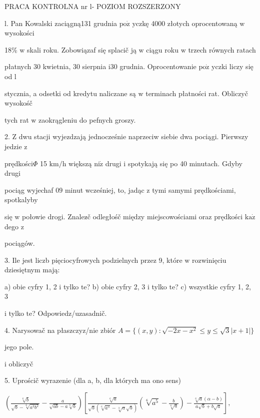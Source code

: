 \documentclass[a4paper,12pt]{article}
\begin{document}
PRACA KONTROLNA nr l- POZIOM ROZSZERZONY

l. Pan Kowalski zaciągną131 grudnia $\mathrm{p}\mathrm{o}\dot{\mathrm{z}}$ yczkę 4000 złotych oprocentowaną $\mathrm{w}$ wysokości

18\% $\mathrm{w}$ skali roku. Zobowiązaf się splacič ją $\mathrm{w}$ ciągu roku $\mathrm{w}$ trzech równych ratach

płatnych 30 kwietnia, 30 sierpnia $\mathrm{i}30$ grudnia. Oprocentowanie $\mathrm{p}\mathrm{o}\dot{\mathrm{z}}$ yczki liczy się od l

stycznia, a odsetki od kredytu naliczane są $\mathrm{w}$ terminach płatności rat. Obliczyč wysokośč

tych rat $\mathrm{w}$ zaokrągleniu do pefnych groszy.

2. $\mathrm{Z}$ dwu stacji wyjezdzają jednocześnie naprzeciw siebie dwa pociągi. Pierwszy jedzie $\mathrm{z}$

prędkości$\Phi$ 15 $\mathrm{k}\mathrm{m}/\mathrm{h}$ większą $\mathrm{n}\mathrm{i}\dot{\mathrm{z}}$ drugi $\mathrm{i}$ spotykają się po 40 minutach. Gdyby drugi

pociąg wyjechaf $09$ minut wcześniej, to, jadąc $\mathrm{z}$ tymi samymi prędkościami, spotkalyby

się $\mathrm{w}$ połowie drogi. Znalez$\acute{}$č odległośč między miejscowościami oraz prędkości $\mathrm{k}\mathrm{a}\dot{\mathrm{z}}$ dego $\mathrm{z}$

pociągów.

3. Ile jest liczb pięciocyfrowych podzielnych przez 9, które $\mathrm{w}$ rozwinięciu dziesiętnym mają:

a) obie cyfry 1, 2 $\mathrm{i}$ tylko $\mathrm{t}\mathrm{e}$? b) obie cyfry 2, 3 $\mathrm{i}$ tylko $\mathrm{t}\mathrm{e}$? c) wszystkie cyfry 1, 2, 3

$\mathrm{i}$ tylko $\mathrm{t}\mathrm{e}$? Odpowiedz/uzasadnič.

4. Narysowač na płaszczyz/nie zbiór $A=\{(x,y):\sqrt{-2x-x^{2}}\leq y\leq\sqrt{3}|x+1|\}$

jego pole.

i obliczyč

5. Uprościč wyrazenie (dla a, b, dla których ma ono sens)

$(\displaystyle \frac{\sqrt[6]{b}}{\sqrt{b}-\sqrt[6]{a^{3}b^{2}}}-\frac{a}{\sqrt{ab}-a\sqrt[3]{b}})[\frac{\sqrt[6]{a}}{\sqrt{b}(\sqrt[6]{a^{5}}-\sqrt[3]{a}\sqrt{b})}(\sqrt[6]{a^{5}}-\frac{b}{\sqrt[6]{a}})-\frac{\sqrt[6]{a}(\alpha-b)}{a\sqrt{b}+b\sqrt{a}}],$
\end{document}
